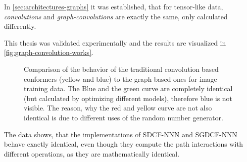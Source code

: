 In \autoref{sec:architectures-graphs} it was established, that for tensor-like data, \emph{convolutions} and \emph{graph-convolutions} are exactly the same, only calculated differently.

This thesis was validated experimentally and the results are visualized in \autoref{fig:graph-convolution-works}.

\begin{figure}[htbp]
    \centering
    \caption{
        Comparison of the behavior of the traditional convolution based conformers (yellow and blue) to the graph based ones for image training data.
        The Blue and the green curve are completely identical (but calculated by optimizing different models), therefore blue is not visible.
        The reason, why the red and yellow curve are not also identical is due to different uses of the random number generator.
    }
    \label{fig:graph-convolution-works}
\end{figure}

The data shows, that the implementations of SDCF-NNN and SGDCF-NNN behave exactly identical, even though they compute the path interactions with different operations, as they are mathematically identical.

